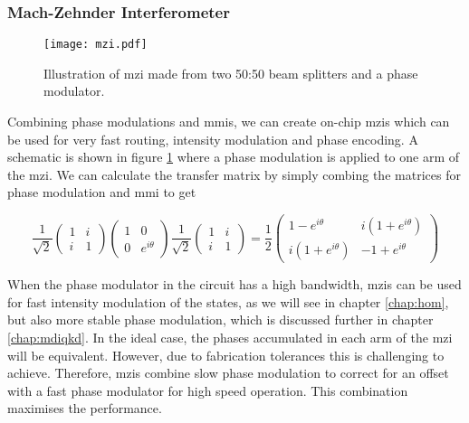 \subsubsection*{Mach-Zehnder Interferometer}

\begin{figure}[t]
	\centering
	\texttt{[image: mzi.pdf]}
	\caption[Mach-Zehnder interferometer schematic]{Illustration of \acs{mzi} made from two 50:50 beam splitters and a phase modulator.}
	\label{fig:mzi}
\end{figure}

Combining phase modulations and \acp{mmi}, we can create on-chip \acp{mzi} which can be used for very fast routing, intensity modulation and phase encoding. A schematic is shown in figure \ref{fig:mzi} where a phase modulation is applied to one arm of the \ac{mzi}.  We can calculate the transfer matrix by simply combing the matrices for phase modulation and \ac{mmi} to get

\begin{equation}
	\frac{1}{\sqrt{2}}\left(
	\begin{matrix}
	1 & i\\
	i & 1
	\end{matrix}
	\right)
	\left(
	\begin{matrix}
	1 & 0\\
	0 & e^{i\theta}
	\end{matrix}
	\right)
	\frac{1}{\sqrt{2}}\left(
	\begin{matrix}
	1 & i\\
	i & 1
	\end{matrix}
	\right)=
	\frac{1}{2}\left(
	\begin{matrix}
	1 - e^{i\theta} & i(1 +  e^{i\theta})\\
	i(1 +  e^{i\theta}) & -1 +  e^{i\theta}
	\end{matrix}
	\right)
\end{equation}

When the phase modulator in the circuit has a high bandwidth, \acp{mzi} can be used for fast intensity modulation of the states, as we will see in chapter \ref{chap:hom}, but also more stable phase modulation, which is discussed further in chapter \ref{chap:mdiqkd}. In the ideal case, the phases accumulated in each arm of the \ac{mzi} will be equivalent. However, due to fabrication tolerances this is challenging to achieve. Therefore, \acp{mzi} combine slow phase modulation to correct for an offset with a fast phase modulator for high speed operation. This combination maximises the performance.

